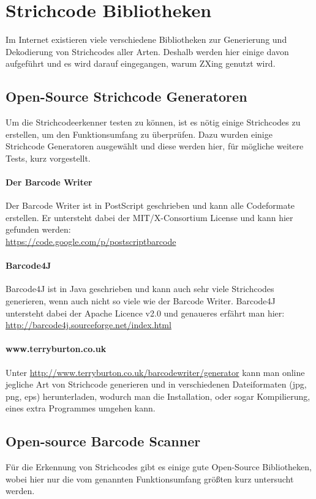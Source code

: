 \section{Strichcode Bibliotheken}
\writtenby{\dcauthornameriren}%
Im Internet existieren viele verschiedene Bibliotheken zur Generierung und Dekodie\-rung von Strichcodes aller Arten. Deshalb werden hier einige davon aufgeführt und es wird darauf eingegangen, warum ZXing genutzt wird.


\subsection*{Open-Source Strichcode Generatoren}
Um die Strichcodeerkenner testen zu können, ist es nötig einige Strichcodes zu erstellen, um den Funktionsumfang zu überprüfen. Dazu wurden einige Strichcode Generatoren ausgewählt und diese werden hier, für mögliche weitere Tests, kurz vorgestellt.

\paragraph*{Der Barcode Writer}
Der Barcode Writer ist in PostScript geschrieben und kann alle Codeformate erstellen. Er untersteht dabei der MIT/X-Consortium License und kann hier gefunden werden:\\ \url{https://code.google.com/p/postscriptbarcode}

\paragraph*{Barcode4J}
Barcode4J ist in Java geschrieben und kann auch sehr viele Strichcodes generieren, wenn auch nicht so viele wie der Barcode Writer. Barcode4J untersteht dabei der Apache Licence v2.0 und genaueres erfährt man hier:\\
\url{http://barcode4j.sourceforge.net/index.html}

\paragraph*{www.terryburton.co.uk}
Unter \url{http://www.terryburton.co.uk/barcodewriter/generator} kann man online jegliche Art von Strichcode generieren und in verschiedenen Dateiformaten (jpg, png, eps) herunterladen, wodurch man die Installation, oder sogar Kompilierung, eines extra Programmes umgehen kann.



\subsection*{Open-source Barcode Scanner}
Für die Erkennung von Strichcodes gibt es einige gute Open-Source Bibliotheken, wobei hier nur die vom genannten Funktionsumfang größten kurz untersucht werden.

